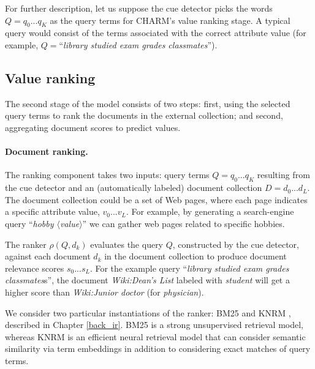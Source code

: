 For further description, let us suppose the cue detector picks the words $Q = q_0 ... q_K$ as the query terms for CHARM's value ranking stage. A typical query would consist of the terms associated with the correct attribute value (for example, $Q=$``\textit{library studied exam grades classmates}'').

\subsection{Value ranking}
The second stage of the model consists of two steps: first, using the selected query terms to rank the documents in the external collection; and second, aggregating document scores to predict values.

\paragraph{Document ranking.}
The ranking component takes two inputs: query terms $Q = q_0 ... q_K$ resulting from the cue detector and an (automatically labeled) document collection $D = d_0 ... d_L$.
The document collection
could be a set
of Web pages, where each page indicates a specific attribute value, $v_0 ... v_L$. 
For example, by 
generating a search-engine query ``\textit{hobby $\langle$value$\rangle$}'' we can gather 
web pages related to specific hobbies. 

The ranker $\rho (Q, d_k)$ evaluates the query $Q$,
constructed by the cue detector,
against each document $d_k$ in the document collection to produce document relevance scores $s_0 ... s_L$. For the example query ``\textit{library studied exam grades classmates}s'', the document \emph{Wiki:Dean's List} labeled with \emph{student} will get a higher score than \emph{Wiki:Junior doctor} (for \emph{physician}). 

We consider two particular instantiations of the ranker:
BM25 \cite{robertson1995okapi} and KNRM \cite{xiong2017end}, described in Chapter \ref{back_ir}.
BM25 is a strong unsupervised retrieval model, whereas KNRM is an efficient neural retrieval model that can consider semantic similarity via term embeddings in addition to considering exact matches of query terms. 

